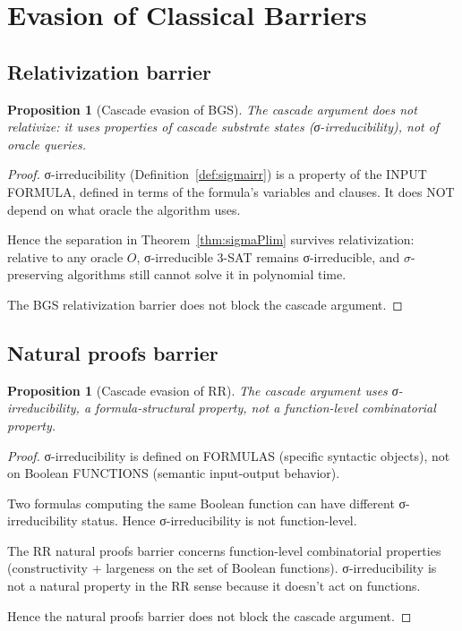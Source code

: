 \documentclass[11pt, a4paper]{amsart}
\newtheorem{proposition}[theorem]{Proposition}
\theoremstyle{definition}
\begin{document}
\section{Evasion of Classical Barriers}\label{sec:barriers}

\subsection{Relativization barrier}

\begin{proposition}[Cascade evasion of BGS]\label{prop:BGS}
The cascade argument does not relativize: it uses properties of
cascade substrate states (σ-irreducibility), not of oracle queries.
\end{proposition}

\begin{proof}
σ-irreducibility (Definition~\ref{def:sigmairr}) is a property of
the INPUT FORMULA, defined in terms of the formula's variables and
clauses. It does NOT depend on what oracle the algorithm uses.

Hence the separation in Theorem~\ref{thm:sigmaPlim} survives
relativization: relative to any oracle $O$, σ-irreducible 3-SAT
remains σ-irreducible, and $\sigma$-preserving algorithms still
cannot solve it in polynomial time.

The BGS relativization barrier does not block the cascade argument.
\end{proof}

\subsection{Natural proofs barrier}

\begin{proposition}[Cascade evasion of RR]\label{prop:RR}
The cascade argument uses σ-irreducibility, a formula-structural
property, not a function-level combinatorial property.
\end{proposition}

\begin{proof}
σ-irreducibility is defined on FORMULAS (specific syntactic objects),
not on Boolean FUNCTIONS (semantic input-output behavior).

Two formulas computing the same Boolean function can have different
σ-irreducibility status. Hence σ-irreducibility is not
function-level.

The RR natural proofs barrier concerns function-level combinatorial
properties (constructivity + largeness on the set of Boolean
functions). σ-irreducibility is not a natural property in the RR
sense because it doesn't act on functions.

Hence the natural proofs barrier does not block the cascade argument.
\end{proof}
\end{document}
